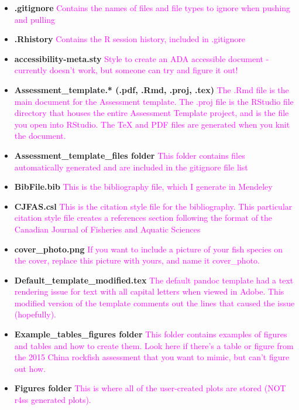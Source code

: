 \documentclass[12pt,]{article}
\begin{document}
\begin{itemize}
\item
  \textbf{.gitignore}
  \textcolor{magenta}{Contains the names of files and file types to ignore when pushing and pulling}
\item
  \textbf{.Rhistory}
  \textcolor{magenta}{Contains the R session history, included in .gitignore}
\item
  \textbf{accessibility-meta.sty}
  \textcolor{magenta}{Style to create an ADA accessible document - currently doesn't work, but someone can try and figure it out!}
\item
  \textbf{Assessment\_template.* (.pdf, .Rmd, .proj, .tex)}
  \textcolor{magenta}{The .Rmd file is the main document for the Assessment template.  The .proj file is the RStudio file directory that houses the entire Assessment Template project, and is the file you open into RStudio.  The TeX and PDF files are generated when you knit the document.}
\item
  \textbf{Assessment\_template\_files folder}
  \textcolor{magenta}{This folder contains files automatically generated and are included in the gitignore file list}
\item
  \textbf{BibFile.bib}
  \textcolor{magenta}{This is the bibliography file, which I generate in Mendeley}
\item
  \textbf{CJFAS.csl}
  \textcolor{magenta}{This is the citation style file for the bibliography.  This particular citation style file creates a references section following the format of the Canadian Journal of Fisheries and Aquatic Sciences}
\item
  \textbf{cover\_photo.png}
  \textcolor{magenta}{If you want to include a picture of your fish species on the cover, replace this picture with yours, and name it cover\_photo.}
\item
  \textbf{Default\_template\_modified.tex}
  \textcolor{magenta}{The default pandoc template had a text rendering issue for text with all capital letters when viewed in Adobe.  This modified version of the template comments out the lines that caused the issue (hopefully).}
\item
  \textbf{Example\_tables\_figures folder}
  \textcolor{magenta}{This folder contains examples of figures and tables and how to create them.  Look here if there's a table or figure from the 2015 China rockfish assessment that you want to mimic, but can't figure out how.}
\item
  \textbf{Figures folder}
  \textcolor{magenta}{This is where all of the user-created plots are stored (NOT r4ss generated plots).}

\end{itemize}
\end{document}
